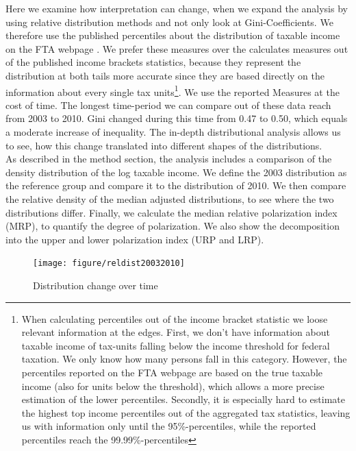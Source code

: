 \documentclass[twoside]{article}\usepackage[]{graphicx}\usepackage[]{color}
\newenvironment{knitrout}{}{} %
\begin{document}
\begin{multicols}{2}
Here we examine how interpretation can change, when we expand the analysis by using relative distribution methods and not only look at Gini-Coefficients. We therefore use the published percentiles about the distribution of taxable income  on the FTA webpage . We prefer these measures over the calculates measures out of the published income brackets statistics, because they represent the distribution at both tails more accurate since they are based directly on the information about every single tax units\footnote{When calculating percentiles out of the income bracket statistic we loose relevant information at the edges. First, we don't have information about taxable income of tax-units falling below the income threshold for federal taxation. We only know how many persons fall in this category. However, the percentiles reported on the FTA webpage are based on the true taxable income (also for units below the threshold), which allows a more precise estimation of the lower percentiles. Secondly, it is especially hard to estimate the highest top income percentiles out of the aggregated tax statistics, leaving us with information only until the 95\%-percentiles, while the reported percentiles reach the 99.99\%-percentiles}. We use the reported Measures at the cost of time. The longest time-period we can compare out of these data reach from 2003 to 2010. Gini changed during this time from 0.47 to 0.50, which equals a moderate increase of inequality. The in-depth distributional analysis allows us to see, how this change translated into different shapes of the distributions. \\

As described in the method section, the analysis includes a comparison of the density distribution of the log taxable income. We define the 2003 distribution as the reference group and compare it to the distribution of 2010. We then compare the relative density of the median adjusted distributions, to see where the two distributions differ. Finally, we calculate the median relative polarization index (MRP), to quantify the degree of polarization. We also show the decomposition into the upper and lower polarization index (URP and LRP).






\begin{knitrout}
\color{fgcolor}\begin{figure}[H]

\texttt{[image: figure/reldist20032010]} \caption[Distribution change over time]{Distribution change over time\label{fig:reldist20032010}}
\end{figure}



\end{knitrout}
\end{multicols}
\end{document}
